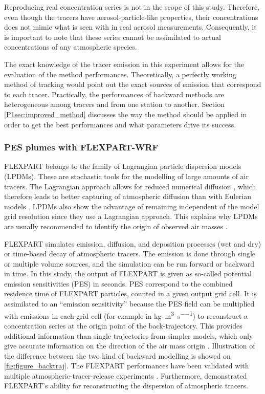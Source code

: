             Reproducing real concentration series is not in the scope of this study. Therefore, even though the tracers have aerosol-particle-like properties, their concentrations does not mimic what is seen with in real aerosol measurements. Consequently, it is important to note that these series cannot be assimilated to actual concentrations of any atmospheric species.

            The exact knowledge of the tracer emission in this experiment allows for the evaluation of the method performances.
            Theoretically, a perfectly working method of tracking would point out the exact sources of emission that correspond to each tracer.
            Practically, the performances of backward methods are heterogeneous among tracers and from one station to another.
           Section \ref{P1sec:improved_method} discusses the way the method should be applied in order to get the best performances and what parameters drive its success.

    \subsubsection{PES plumes with FLEXPART-WRF}
        \label{P1sec:FLEXPART}
        FLEXPART belongs to the family of Lagrangian particle dispersion models (LPDMs). These are stochastic tools for the modelling of large amounts of air tracers.
        The Lagrangian approach allows for reduced numerical diffusion \citep{cassiani_offline_2016}, which therefore leads to better capturing of atmospheric diffusion than with Eulerian models \citep[]{pisso_lagrangian_2019}. LPDMs also show the advantage of remaining independent of the model grid resolution since they use a Lagrangian approach.
        This explains why LPDMs are usually recommended to identify the origin of observed air masses \citep{stohl_replacement_2002}.

        FLEXPART \citep{pisso_lagrangian_2019} simulates emission, diffusion, and deposition processes (wet and dry) or time-based decay of atmospheric tracers.
        The emission is done through single or multiple volume sources, and the simulation can be run forward or backward in time.
        In this study, the output of FLEXPART is given as so-called potential emission sensitivities (PES) in seconds. PES correspond to the combined residence time of FLEXPART particles, counted in a given output grid cell. It is assimilated to an ``emission sensitivity'' because the PES field can be multiplied with emissions in each grid cell (for example in \si{\kg\per\cubic\meter\per\second}) to reconstruct a concentration series at the origin point of the back-trajectory. This provides additional information than single trajectories from simpler models, which only give accurate information on the direction of the air mass origin  \citep{hirdman_transport_2009}.
        Illustration of the difference between the two kind of backward modelling is showed on \cref{fig:figure_backtraj}.
        The FLEXPART performances have been validated with multiple atmospheric-tracer-release experiments \citep{stohl_validation_1998}.
        Furthermore, \citet{hegarty_evaluation_2013} demonstrated FLEXPART's ability for reconstructing the dispersion of atmospheric tracers.

